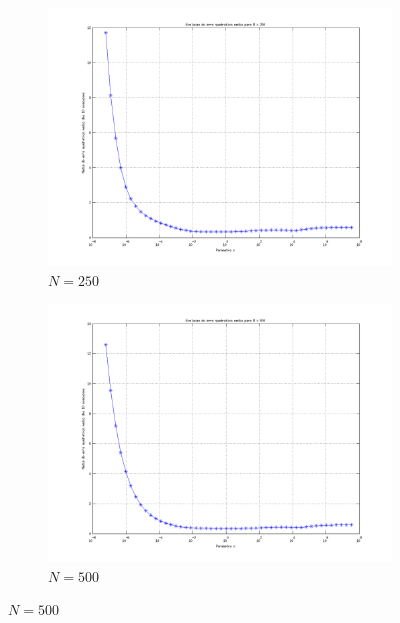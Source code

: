 \begin{figure}[H]
			\begin{subfigure}{.5\textwidth}
				  \centering
				  \includegraphics[width=1\linewidth]{image/elm_250_neurons}
				  \caption{\(N=250\)}
				  \label{fig:elm250}
				\end{subfigure}%
				\begin{subfigure}{.5\textwidth}
				  \centering
				  \includegraphics[width=1\linewidth]{image/elm_500_neurons}
				  \caption{\(N=500\)}
				  \label{fig:elm500}
				\end{subfigure}			
			

\end{figure}
